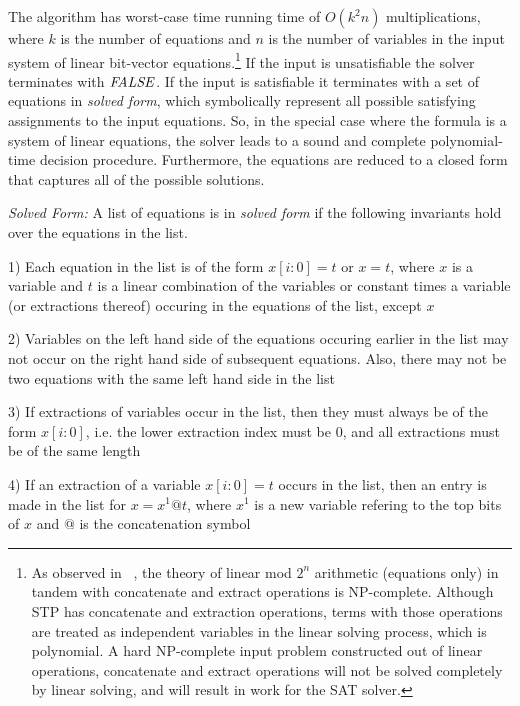 
The algorithm has worst-case time running time of $O(k^2n)$
multiplications, where $k$ is the number of equations and $n$ is the
number of variables in the input system of linear bit-vector
equations.\footnote{As observed in ~\cite{BDL98}, the theory of linear
mod $2^n$ arithmetic (equations only) in tandem with concatenate and
extract operations is NP-complete. Although STP has concatenate and
extraction operations, terms with those operations are treated as
independent variables in the linear solving process, which is
polynomial. 
A hard
NP-complete input problem constructed out of linear operations,
concatenate and extract operations will not be solved completely by
linear solving, and will result in work for the SAT solver.}  If the
input is unsatisfiable the solver terminates with ${\it FALSE}$. If the
input is satisfiable it terminates with a set of equations in
\textit{solved form}, which symbolically represent all possible
satisfying assignments to the input equations.  So, in the special
case where the formula is a system of linear equations, the solver
leads to a sound and complete polynomial-time decision procedure.
Furthermore, the equations are reduced to a closed form that captures
all of the possible solutions.

\begin{definition}
\emph{Solved Form:} A list of equations is in
\textit{solved form} if the following invariants hold over the
equations in the list.

1) Each equation in the list is of the form $x[i:0] = t$ or $x=t$,
where $x$ is a variable and $t$ is a linear combination of the
variables or constant times a variable (or extractions thereof)
occuring in the equations of the list, except $x$

2) Variables on the left hand side of the equations occuring earlier
in the list may not occur on the right hand side of subsequent
equations. Also, there may not be two equations with the same left
hand side in the list

3) If extractions of variables occur in the list, then they must
always be of the form $x[i:0]$, i.e. the lower extraction index must
be 0, and all extractions must be of the same length

4) If an extraction of a variable $x[i:0]= t$ occurs in the list, then
   an entry is made in the list for $x=x^{1}@t$, where $x^1$ is a new
   variable refering to the top bits of $x$ and $@$ is the
   concatenation symbol
\end{definition}

